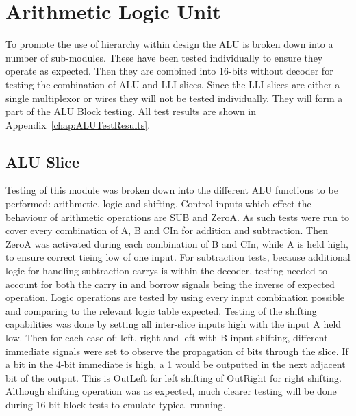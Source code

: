 
\section{Arithmetic Logic Unit}

To promote the use of hierarchy within design the ALU is broken down into a number of sub-modules. These have been tested individually to ensure they operate as expected. Then they are combined into 16-bits without decoder for testing the combination of ALU and LLI slices. Since the LLI slices are either a single multiplexor or wires they will not be tested individually. They will form a part of the ALU Block testing. All test results are shown in Appendix~\ref{chap:ALUTestResults}.

\subsection{ALU Slice}
Testing of this module was broken down into the different ALU functions to be performed: arithmetic, logic and shifting. Control inputs which effect the behaviour of arithmetic operations are SUB and ZeroA. As such tests were run to cover every combination of A, B and CIn for addition and subtraction. Then ZeroA was activated during each combination of B and CIn, while A is held high, to ensure correct tieing low of one input. 
For subtraction tests, because additional logic for handling subtraction carrys is within the decoder, testing needed to account for both the carry in and borrow signals being the inverse of expected operation.
Logic operations are tested by using every input combination possible and comparing to the relevant logic table expected.
Testing of the shifting capabilities was done by setting all inter-slice inputs high with the input A held low. Then for each case of: left, right and left with B input shifting, different immediate signals were set to observe the propagation of bits through the slice. If a bit in the 4-bit immediate is high, a 1 would be outputted in the next adjacent bit of the output. This is OutLeft for left shifting of OutRight for right shifting.
Although shifting operation was as expected, much clearer testing will be done during 16-bit block tests to emulate typical running. 

